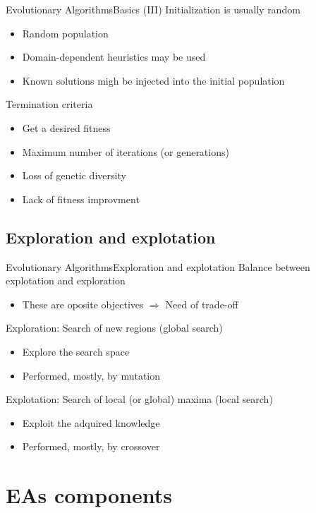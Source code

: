 \documentclass[10pt,compress]{beamer} %
\begin{document}
\begin{frame}{Evolutionary Algorithms}{Basics (III)}
	Initialization is usually random
	\begin{itemize}
		\item Random population
		\item Domain-dependent heuristics may be used
		\item Known solutions migh be injected into the initial population
	\end{itemize}
	Termination criteria
	\begin{itemize}
		\item Get a desired fitness
		\item Maximum number of iterations (or generations)
		\item Loss of genetic diversity
		\item Lack of fitness improvment
	\end{itemize}
\end{frame}

\subsection{Exploration and explotation}
\begin{frame}{Evolutionary Algorithms}{Exploration and explotation} 
	Balance between \alert{explotation} and \alert{exploration}
        \begin{itemize}
	    \item These are oposite objectives $\Rightarrow$ Need of trade-off
        \end{itemize}
	Exploration: Search of new regions (\alert{global search})
		\begin{itemize}
		\item Explore the search space
		\item Performed, mostly, by mutation
		\end{itemize}
	Explotation: Search of local (or global) maxima (\alert{local search})
		\begin{itemize}
		\item Exploit the adquired knowledge
		\item Performed, mostly, by crossover
		\end{itemize}
\end{frame}


\section{EAs components}
\end{document}
